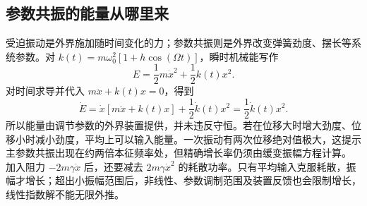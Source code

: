 \subsection{参数共振的能量从哪里来}
受迫振动是外界施加随时间变化的力；参数共振则是外界改变弹簧劲度、摆长等系统参数。对 $k(t)=m\omega_0^2[1+h\cos(\Omega t)]$，瞬时机械能写作
\[
 E=\frac12m\dot x^2+\frac12k(t)x^2.
\]
对时间求导并代入 $m\ddot x+k(t)x=0$，得到
\[
 \dot E=\dot x[m\ddot x+k(t)x]+\frac12\dot k(t)x^2
 =\frac12\dot k(t)x^2.
\]
所以能量由调节参数的外界装置提供，并未违反守恒。若在位移大时增大劲度、位移小时减小劲度，平均上可以输入能量。一次振动有两次位移绝对值极大，这提示主参数共振出现在约两倍本征频率处，但精确增长率仍须由缓变振幅方程计算。
加入阻力 $-2m\gamma\dot x$ 后，还要减去 $2m\gamma\dot x^2$ 的耗散功率。只有平均输入克服耗散，振幅才增长；超出小振幅范围后，非线性、参数调制范围及装置反馈也会限制增长，线性指数解不能无限外推。
